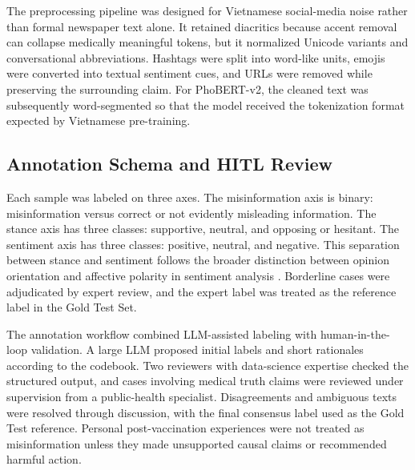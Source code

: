\documentclass[runningheads]{llncs}
\begin{document}
The preprocessing pipeline was designed for Vietnamese social-media noise rather than formal newspaper text alone. It retained diacritics because accent removal can collapse medically meaningful tokens, but it normalized Unicode variants and conversational abbreviations. Hashtags were split into word-like units, emojis were converted into textual sentiment cues, and URLs were removed while preserving the surrounding claim. For PhoBERT-v2, the cleaned text was subsequently word-segmented so that the model received the tokenization format expected by Vietnamese pre-training.

\subsection{Annotation Schema and HITL Review}
Each sample was labeled on three axes. The misinformation axis is binary: misinformation versus correct or not evidently misleading information. The stance axis has three classes: supportive, neutral, and opposing or hesitant. The sentiment axis has three classes: positive, neutral, and negative. This separation between stance and sentiment follows the broader distinction between opinion orientation and affective polarity in sentiment analysis \cite{pang2008opinion}. Borderline cases were adjudicated by expert review, and the expert label was treated as the reference label in the Gold Test Set.

The annotation workflow combined LLM-assisted labeling with human-in-the-loop validation. A large LLM proposed initial labels and short rationales according to the codebook. Two reviewers with data-science expertise checked the structured output, and cases involving medical truth claims were reviewed under supervision from a public-health specialist. Disagreements and ambiguous texts were resolved through discussion, with the final consensus label used as the Gold Test reference. Personal post-vaccination experiences were not treated as misinformation unless they made unsupported causal claims or recommended harmful action.
\end{document}

